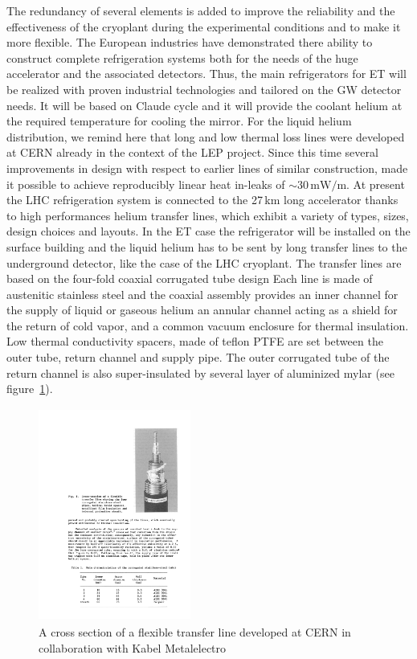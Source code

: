 The redundancy of several elements is added to improve the reliability and the effectiveness of the cryoplant during the experimental conditions and to make it more flexible. The European industries have demonstrated there ability to construct complete refrigeration systems both for the needs of the huge accelerator and the associated detectors. Thus, the main refrigerators for ET will be realized with proven industrial technologies and tailored on the GW detector needs. It will be based on Claude cycle and it will provide the coolant helium at the required temperature for cooling the mirror. For the liquid helium distribution, we remind here that long and low thermal loss lines were developed at CERN already in the context of the LEP project. Since this time several improvements in design with respect to earlier lines of similar construction, made it possible to achieve reproducibly linear heat in-leaks of $\sim 30\,\mathrm{mW/m}$. At present the LHC refrigeration system is connected to the 27\,km long accelerator thanks to high performances helium transfer lines, which exhibit a variety of types, sizes, design choices and layouts. In the ET case the refrigerator will be installed on the surface building and the liquid helium has to be sent by long transfer lines to the underground detector, like the case of the LHC cryoplant. The transfer lines are based on the four-fold coaxial corrugated tube design Each line is made of austenitic stainless steel and the coaxial assembly provides an inner channel for the supply of liquid or gaseous helium an annular channel acting as a shield for the return of cold vapor, and a common vacuum enclosure for thermal insulation. Low thermal conductivity spacers, made of teflon PTFE are set between the outer tube, return channel and supply pipe. The outer corrugated tube of the return channel is also super-insulated by several layer of aluminized mylar (see figure~\ref{fig:transfer_line}). 
\begin{figure}[htbp] 
\begin{center} 
\includegraphics[width=5cm, height=7cm]{Detector/DetFigures/transfer_line.pdf} 
\caption{A cross section of a flexible transfer line developed at CERN in collaboration with Kabel Metalelectro~\cite{Lebrun}} 
\label{fig:transfer_line} 
\end{center} 
\end{figure} 


